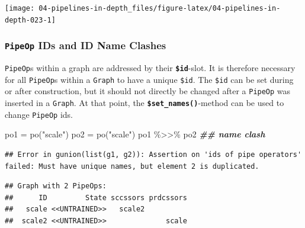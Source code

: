 \documentclass[
]{scrbook}
\newenvironment{Shaded}{\begin{snugshade}}{\end{snugshade}}
\newcommand{\DocumentationTok}[1]{\textcolor[rgb]{0.56,0.35,0.01}{\textbf{\textit{#1}}}}
\newcommand{\FunctionTok}[1]{\textcolor[rgb]{0.00,0.00,0.00}{#1}}
\newcommand{\NormalTok}[1]{#1}
\newcommand{\OtherTok}[1]{\textcolor[rgb]{0.56,0.35,0.01}{#1}}
\newcommand{\SpecialCharTok}[1]{\textcolor[rgb]{0.00,0.00,0.00}{#1}}
\newcommand{\StringTok}[1]{\textcolor[rgb]{0.31,0.60,0.02}{#1}}
\renewenvironment{Shaded} {\begin{snugshade}\small} {\end{snugshade}}
\begin{document}
\begin{center}\texttt{[image: 04-pipelines-in-depth\_files/figure-latex/04-pipelines-in-depth-023-1]} \end{center}

\hypertarget{pipeop-ids-and-id-name-clashes}{%
\subsubsection{\texorpdfstring{\texttt{PipeOp} IDs and ID Name Clashes}{PipeOp IDs and ID Name Clashes}}\label{pipeop-ids-and-id-name-clashes}}

\texttt{PipeOp}s within a graph are addressed by their \textbf{\texttt{\$id}}-slot.
It is therefore necessary for all \texttt{PipeOp}s within a \texttt{Graph} to have a unique \texttt{\$id}.
The \texttt{\$id} can be set during or after construction, but it should not directly be changed after a \texttt{PipeOp} was inserted in a \texttt{Graph}.
At that point, the \textbf{\texttt{\$set\_names()}}-method can be used to change \texttt{PipeOp} ids.

\begin{Shaded}
\begin{Highlighting}[]
\NormalTok{po1 }\OtherTok{=} \FunctionTok{po}\NormalTok{(}\StringTok{"scale"}\NormalTok{)}
\NormalTok{po2 }\OtherTok{=} \FunctionTok{po}\NormalTok{(}\StringTok{"scale"}\NormalTok{)}
\NormalTok{po1 }\SpecialCharTok{\%\textgreater{}\textgreater{}\%}\NormalTok{ po2  }\DocumentationTok{\#\# name clash}
\end{Highlighting}
\end{Shaded}

\begin{verbatim}
## Error in gunion(list(g1, g2)): Assertion on 'ids of pipe operators' failed: Must have unique names, but element 2 is duplicated.
\end{verbatim}

\begin{Shaded}
\end{Shaded}

\begin{verbatim}
## Graph with 2 PipeOps:
##      ID         State sccssors prdcssors
##   scale <<UNTRAINED>>   scale2          
##  scale2 <<UNTRAINED>>              scale
\end{verbatim}
\end{document}
